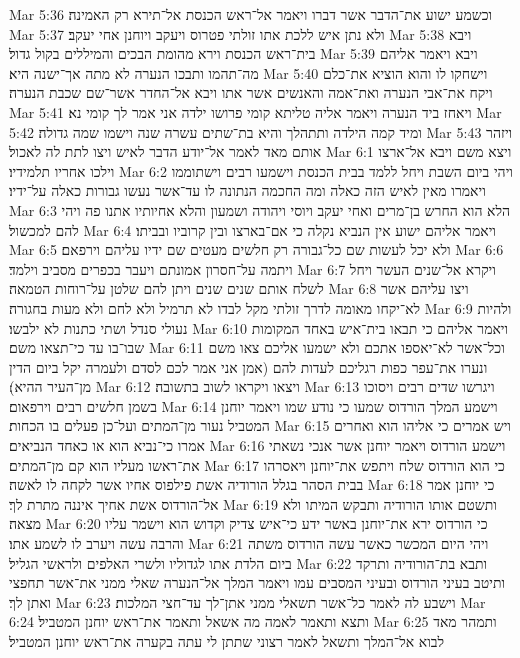 Mar 5:36  וכשמע ישוע את־הדבר אשר דברו ויאמר אל־ראש הכנסת אל־תירא רק האמינה׃
Mar 5:37  ולא נתן איש ללכת אתו זולתי פטרוס ויעקב ויוחנן אחי יעקב׃
Mar 5:38  ויבא בית־ראש הכנסת וירא מהומת הבכים והמיללים בקול גדול׃
Mar 5:39  ויבא ויאמר אליהם מה־תהמו ותבכו הנערה לא מתה אך־ישנה היא׃
Mar 5:40  וישחקו לו והוא הוציא את־כלם ויקח את־אבי הנערה ואת־אמה והאנשים אשר אתו ויבא אל־החדר אשר־שם שכבת הנערה׃
Mar 5:41  ויאחז ביד הנערה ויאמר אליה טליתא קומי פרושו ילדה אני אמר לך קומי נא׃
Mar 5:42  ומיד קמה הילדה ותתהלך והיא בת־שתים עשרה שנה וישמו שמה גדולה׃
Mar 5:43  ויזהר אותם מאד לאמר אל־יודע הדבר לאיש ויצו לתת לה לאכול׃
Mar 6:1  ויצא משם ויבא אל־ארצו וילכו אחריו תלמידיו׃
Mar 6:2  ויהי ביום השבת ויחל ללמד בבית הכנסת וישמעו רבים וישתוממו ויאמרו מאין לאיש הזה כאלה ומה החכמה הנתונה לו עד־אשר נעשו גבורות כאלה על־ידיו׃
Mar 6:3  הלא הוא החרש בן־מרים ואחי יעקב ויוסי ויהודה ושמעון והלא אחיותיו אתנו פה ויהי להם למכשול׃
Mar 6:4  ויאמר אליהם ישוע אין הנביא נקלה כי אם־בארצו ובין קרוביו ובביתו׃
Mar 6:5  ולא יכל לעשות שם כל־גבורה רק חלשים מעטים שם ידיו עליהם וירפאם׃
Mar 6:6  ויתמה על־חסרון אמונתם ויעבר בכפרים מסביב וילמד׃
Mar 6:7  ויקרא אל־שנים העשר ויחל לשלח אותם שנים שנים ויתן להם שלטן על־רוחות הטמאה׃
Mar 6:8  ויצו עליהם אשר לא־יקחו מאומה לדרך זולתי מקל לבדו לא תרמיל ולא לחם ולא מעות בחגורה׃
Mar 6:9  ולהיות נעולי סנדל ושתי כתנות לא ילבשו׃
Mar 6:10  ויאמר אליהם כי תבאו בית־איש באחד המקומות שבו־בו עד כי־תצאו משם׃
Mar 6:11  וכל־אשר לא־יאספו אתכם ולא ישמעו אליכם צאו משם ונערו את־עפר כפות רגליכם לעדות להם (אמן אני אמר לכם לסדם ולעמרה יקל ביום הדין מן־העיר ההיא)׃
Mar 6:12  ויצאו ויקראו לשוב בתשובה׃
Mar 6:13  ויגרשו שדים רבים ויסוכו בשמן חלשים רבים וירפאום׃
Mar 6:14  וישמע המלך הורדוס שמעו כי נודע שמו ויאמר יוחנן המטביל נעור מן־המתים ועל־כן פעלים בו הכחות׃
Mar 6:15  ויש אמרים כי אליהו הוא ואחרים אמרו כי־נביא הוא או כאחד הנביאים׃
Mar 6:16  וישמע הורדוס ויאמר יוחנן אשר אנכי נשאתי את־ראשו מעליו הוא קם מן־המתים׃
Mar 6:17  כי הוא הורדוס שלח ויתפש את־יוחנן ויאסרהו בבית הסהר בגלל הורודיה אשת פילפוס אחיו אשר לקחה לו לאשה׃
Mar 6:18  כי יוחנן אמר אל־הורדוס אשת אחיך איננה מתרת לך׃
Mar 6:19  ותשטם אותו הורודיה ותבקש המיתו ולא מצאה׃
Mar 6:20  כי הורדוס ירא את־יוחנן באשר ידע כי־איש צדיק וקדוש הוא וישמר עליו והרבה עשה ויערב לו לשמע אתו׃
Mar 6:21  ויהי היום המכשר כאשר עשה הורדוס משתה ביום הלדת אתו לגדוליו ולשרי האלפים ולראשי הגליל׃
Mar 6:22  ותבא בת־הורודיה ותרקד ותיטב בעיני הורדוס ובעיני המסבים עמו ויאמר המלך אל־הנערה שאלי ממני את־אשר תחפצי ואתן לך׃
Mar 6:23  וישבע לה לאמר כל־אשר תשאלי ממני אתן־לך עד־חצי המלכות׃
Mar 6:24  ותצא ותאמר לאמה מה אשאל ותאמר את־ראש יוחנן המטביל׃
Mar 6:25  ותמהר מאד לבוא אל־המלך ותשאל לאמר רצוני שתתן לי עתה בקערה את־ראש יוחנן המטביל׃

